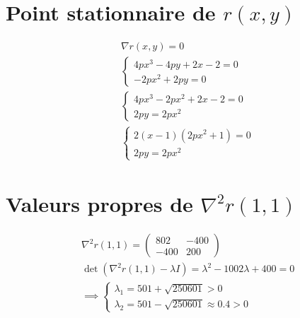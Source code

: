 \documentclass[3p, twocolumn]{elsarticle}
\begin{document}
\begin{appendices}
    \section{Point stationnaire de $r(x,y)$}
    \label{ap:calcul-mini-rosenbrock}
    \begin{align*}
        &\nabla r(x,y) = 0 \\
        &\begin{cases}
            4px^3-4py+2x-2=0\\
            -2px^2+2py=0
        \end{cases}\\
        &\begin{cases}
            4px^3-2px^2+2x-2=0\\
            2py=2px^2
        \end{cases}\\
        &\begin{cases}
            2(x-1)(2px^2+1)=0\\
            2py=2px^2
        \end{cases}
    \end{align*}
    \section{Valeurs propres de $\nabla ^2 r(1,1)$}
    \label{ap:calcul-vp-rosenbrock}
    \begin{align*}
        &\nabla ^2 r(1,1) = 
        \begin{pmatrix}
            802 & -400\\
            -400 & 200
        \end{pmatrix}\\
        &\det(\nabla ^2 r(1,1)-\lambda I)=\lambda^2-1002\lambda+400 = 0\\
        &\implies 
        \begin{cases}
            \lambda_1 = 501 + \sqrt{250601} > 0\\
            \lambda_2 = 501 - \sqrt{250601} \approx 0.4 > 0
        \end{cases}
    \end{align*}
\end{appendices}

\nocite{*}

{\footnotesize
}
{}
\end{document}
